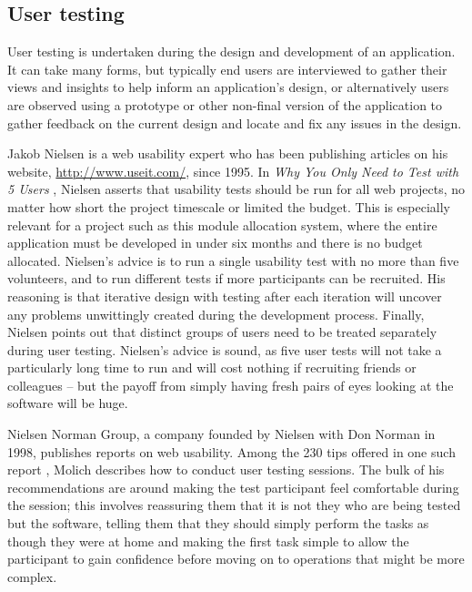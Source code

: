 
\subsection{User testing}

User testing is undertaken during the design and development of an
application. It can take many forms, but typically end users are interviewed
to gather their views and insights to help inform an application's design, or
alternatively users are observed using a prototype or other non-final version
of the application to gather feedback on the current design and locate and fix
any issues in the design.

Jakob Nielsen is a web usability expert who has been publishing articles on
his website, \url{http://www.useit.com/}, since 1995. In \emph{Why You Only
Need to Test with 5 Users} \cite{nielsen2000fiveusers}, Nielsen asserts that
usability tests should be run for all web projects, no matter how short the
project timescale or limited the budget. This is especially relevant for a
project such as this module allocation system, where the entire application
must be developed in under six months and there is no budget allocated.
Nielsen's advice is to run a single usability test with no more than five
volunteers, and to run different tests if more participants can be recruited.
His reasoning is that iterative design with testing after each iteration will
uncover any problems unwittingly created during the development process.
Finally, Nielsen points out that distinct groups of users need to be treated
separately during user testing. Nielsen's advice is sound, as five user tests
will not take a particularly long time to run and will cost nothing if
recruiting friends or colleagues -- but the payoff from simply having fresh
pairs of eyes looking at the software will be huge.

Nielsen Norman Group, a company founded by Nielsen with Don Norman in 1998,
publishes reports on web usability. Among the 230 tips offered in one such
report \cite{nng2001tipsusability}, Molich describes how to conduct user
testing sessions. The bulk of his recommendations are around making the test
participant feel comfortable during the session; this involves reassuring them
that it is not they who are being tested but the software, telling them that
they should simply perform the tasks as though they were at home and making
the first task simple to allow the participant to gain confidence before
moving on to operations that might be more complex.

